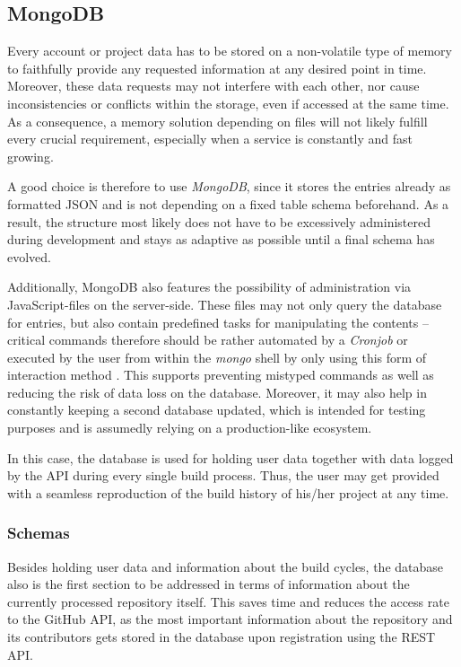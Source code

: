 \subsection{MongoDB}
Every account or project data has to be stored on a non-volatile type of memory to faithfully provide any requested information at any desired point in time. Moreover, these data requests may not interfere with each other, nor cause inconsistencies or conflicts within the storage, even if accessed at the same time. As a consequence, a memory solution depending on files will not likely fulfill every crucial requirement, especially when a service is constantly and fast growing.

A good choice is therefore to use \emph{MongoDB}, since it stores the entries already as formatted JSON and is not depending on a fixed table schema beforehand. As a result, the structure most likely does not have to be excessively administered during development and stays as adaptive as possible until a final schema has evolved.

Additionally, MongoDB also features the possibility of administration via
JavaScript-files on the server-side. These files may not only query the database for entries, but also contain predefined tasks for manipulating the contents -- critical commands therefore should be rather automated by a \emph{Cronjob} or executed by the user from within the \emph{mongo} shell by only using this form of interaction method \cite{MongoDBWritingScripts}. This supports preventing mistyped commands as well as reducing the risk of data loss on the database. Moreover, it may also help in constantly keeping a second database updated, which is intended for testing purposes and is assumedly relying on a production-like ecosystem.

In this case, the database is used for holding user data together with data logged by the API during every single build process. Thus, the user may get provided with a seamless reproduction of the build history of his/her project at any time.

\subsubsection{Schemas}
Besides holding user data and information about the build cycles, the database also is the first section to be addressed in terms of information about the currently processed repository itself. This saves time and reduces the access rate to the GitHub API, as the most important information about the repository and its contributors gets stored in the database upon registration using the REST API.

